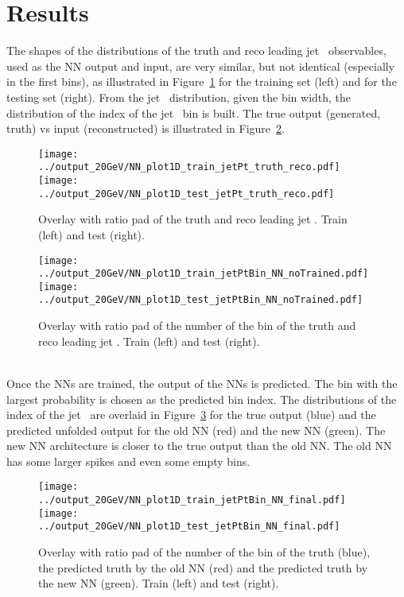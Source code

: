\section{Results}
\label{sec:Results}

The shapes of the distributions of the truth and reco leading jet \pt~observables, used as the NN output and input, are very similar, but not identical (especially in the first bins), as illustrated in Figure~\ref{fig:jetPt} for the training set (left) and for the testing set (right). From the jet \pt~distribution, given the bin width, the distribution of the index of the jet \pt~bin is built. The true output (generated, truth) vs input (reconstructed) is illustrated in Figure~\ref{fig:ptIndexNoTrained}.

\begin{figure}[h]
  \centering
  \texttt{[image: ../output\_20GeV/NN\_plot1D\_train\_jetPt\_truth\_reco.pdf]}
  \texttt{[image: ../output\_20GeV/NN\_plot1D\_test\_jetPt\_truth\_reco.pdf]}
  \caption{Overlay with ratio pad of the truth and reco leading jet \pt. Train (left) and test (right).}
  \label{fig:jetPt}
\end{figure}



\begin{figure}[h]
  \centering
  \texttt{[image: ../output\_20GeV/NN\_plot1D\_train\_jetPtBin\_NN\_noTrained.pdf]}
  \texttt{[image: ../output\_20GeV/NN\_plot1D\_test\_jetPtBin\_NN\_noTrained.pdf]}
  \caption{Overlay with ratio pad of the number of the bin of the truth and reco leading jet \pt. Train (left) and test (right).}
  \label{fig:ptIndexNoTrained}
\end{figure}

\ \\Once the NNs are trained, the output of the NNs is predicted. The bin with the largest probability is chosen as the predicted bin index. The distributions of the index of the jet \pt~are overlaid in Figure~\ref{fig:ptIndexFinal} for the true output (blue) and the predicted unfolded output for the old NN (red) and the new NN (green). The new NN architecture is closer to the true output than the old NN. The old NN has some larger spikes and even some empty bins.

\begin{figure}[h]
  \centering
  \texttt{[image: ../output\_20GeV/NN\_plot1D\_train\_jetPtBin\_NN\_final.pdf]}
  \texttt{[image: ../output\_20GeV/NN\_plot1D\_test\_jetPtBin\_NN\_final.pdf]}
  \caption{Overlay with ratio pad of the number of the bin of the truth (blue), the predicted truth by the old NN (red) and the predicted truth by the new NN (green). Train (left) and test (right).}
  \label{fig:ptIndexFinal}
\end{figure}

